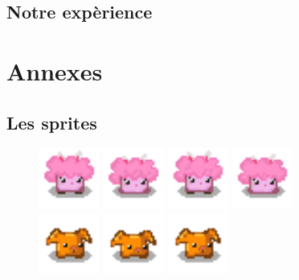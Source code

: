 \documentclass{article}
\begin{document}
    \subsection{Notre expèrience}
\section{Annexes}
    \subsection{Les sprites}
    \begin{figure}[h]
        \centering
        \includegraphics[height = 2cm]{risette/idle_0.png}
        \includegraphics[height = 2cm]{risette/idle_1.png}
        \includegraphics[height = 2cm]{risette/idle_2.png}
        \includegraphics[height = 2cm]{risette/idle_3.png}
        \\
        \includegraphics[height = 2cm]{haricot/idle_0.png}
        \includegraphics[height = 2cm]{haricot/idle_1.png}
        \includegraphics[height = 2cm]{haricot/idle_2.png}

\end{figure}
\end{document}

